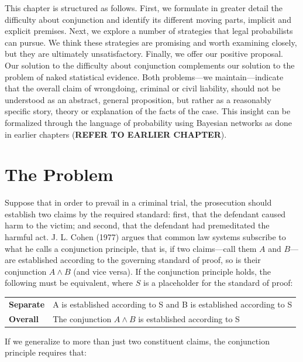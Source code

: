 \documentclass[
  10pt,
  dvipsnames,enabledeprecatedfontcommands]{scrartcl}
\newcommand{\et}{\wedge}
\begin{document}
This chapter is structured as follows. First, we formulate in greater
detail the difficulty about conjunction and identify its different
moving parts, implicit and explicit premises. Next, we explore a number
of strategies that legal probabilists can pursue. We think these
strategies are promising and worth examining closely, but they are
ultimately unsatisfactory. Finally, we offer our positive proposal. Our
solution to the difficulty about conjunction complements our solution to
the problem of naked statistical evidence. Both problems---we
maintain---indicate that the overall claim of wrongdoing, criminal or
civil liability, should not be understood as an abstract, general
proposition, but rather as a reasonably specific story, theory or
explanation of the facts of the case. This insight can be formalized
through the language of probability using Bayesian networks as done in
earlier chapters (\textbf{REFER TO EARLIER CHAPTER}).

\hypertarget{the-problem}{%
\section{The Problem}\label{the-problem}}

Suppose that in order to prevail in a criminal trial, the prosecution
should establish two claims by the required standard: first, that the
defendant caused harm to the victim; and second, that the defendant had
premeditated the harmful act. J. L. Cohen (1977) argues that common law
systems subscribe to what he calls a conjunction principle, that is, if
two claims---call them \(A\) and \(B\)---are established according to
the governing standard of proof, so is their conjunction \(A\wedge B\)
(and vice versa). If the conjunction principle holds, the following must
be equivalent, where \(S\) is a placeholder for the standard of proof:

\begin{center}
\begin{tabular}
{@{}ll@{}}
\toprule
\textbf{Separate} &   A is established according to S and B is established according to S\\   
\textbf{Overall}  &   The conjunction $A \et B$ is established according to S  \\ 
\bottomrule
\end{tabular}
\end{center}

\noindent If we generalize to more than just two constituent claims, the
conjunction principle requires that:
\end{document}
